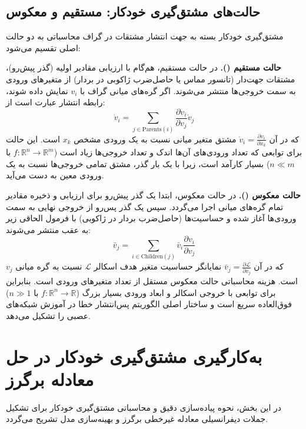 \subsection{حالت‌های مشتق‌گیری خودکار: مستقیم و معکوس}
مشتق‌گیری خودکار بسته به جهت انتشار مشتقات در گراف محاسباتی به دو حالت اصلی تقسیم می‌شود:

\textbf{حالت مستقیم ().} در حالت مستقیم، هم‌گام با ارزیابی مقادیر اولیه (گذر پیش‌رو)، مشتقات جهت‌دار (تانسور مماس یا حاصل‌ضرب ژاکوبی در بردار) از متغیرهای ورودی به سمت خروجی‌ها منتشر می‌شوند. اگر گره‌های میانی گراف با $v_i$ نمایش داده شوند، رابطه انتشار عبارت است از:
\begin{equation}
\dot{v}_i = \sum_{j \in \text{Parents}(i)} \frac{\partial v_i}{\partial v_j} \dot{v}_j
\label{eq:ad-forward}
\end{equation}
که در آن $\dot{v}_i = \frac{\partial v_i}{\partial x_k}$ مشتق متغیر میانی نسبت به یک ورودی مشخص $x_k$ است. این حالت برای توابعی که تعداد ورودی‌های آن‌ها اندک و تعداد خروجی‌ها زیاد است ($f: \mathbb{R}^n \to \mathbb{R}^m$ با $n \ll m$) بسیار کارآمد است، زیرا با یک بار گذر، مشتق تمامی خروجی‌ها نسبت به یک ورودی معین به دست می‌آید.

\textbf{حالت معکوس ().} در حالت معکوس، ابتدا یک گذر پیش‌رو برای ارزیابی و ذخیره مقادیر تمام گره‌های میانی اجرا می‌گردد. سپس یک گذر پس‌رو از خروجی نهایی به سمت ورودی‌ها آغاز شده و حساسیت‌ها (حاصل‌ضرب بردار در ژاکوبی) با فرمول الحاقی زیر به عقب منتشر می‌شوند:
\begin{equation}
\bar{v}_j = \sum_{i \in \text{Children}(j)} \bar{v}_i \frac{\partial v_i}{\partial v_j}
\label{eq:ad-reverse}
\end{equation}
که در آن $\bar{v}_j = \frac{\partial \mathcal{L}}{\partial v_j}$ نمایانگر حساسیت متغیر هدف اسکالر $\mathcal{L}$ نسبت به گره میانی $v_j$ است. هزینه محاسباتی حالت معکوس مستقل از تعداد متغیرهای ورودی است. بنابراین برای توابعی با خروجی اسکالر و ابعاد ورودی بسیار بزرگ ($f: \mathbb{R}^n \to \mathbb{R}$ با $n \gg 1$) فوق‌العاده سریع است و ساختار اصلی الگوریتم پس‌انتشار خطا در آموزش شبکه‌های عصبی را تشکیل می‌دهد.

\section{به‌کارگیری مشتق‌گیری خودکار در حل معادله برگرز}
\label{sec:ad-burgers}

در این بخش، نحوه پیاده‌سازی دقیق و محاسباتی مشتق‌گیری خودکار برای تشکیل جملات دیفرانسیلی معادله غیرخطی برگرز و بهینه‌سازی مدل تشریح می‌گردد.


